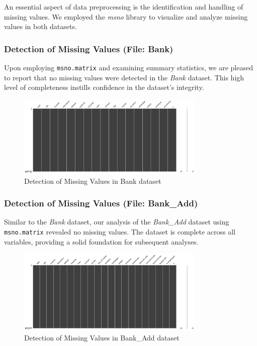 \documentclass{article}
\begin{document}
An essential aspect of data preprocessing is the identification and handling of missing values. We employed the \textit{msno} library to visualize and analyze missing values in both datasets.

\subsubsection{Detection of Missing Values (File: Bank)}
Upon employing \texttt{msno.matrix} and examining summary statistics, we are pleased to report that no missing values were detected in the \textit{Bank} dataset. This high level of completeness instills confidence in the dataset's integrity.
\begin{figure}[h]
    \centering
    \includegraphics[width=0.8\textwidth]{data/bank_marketing/pic/Outlier/miss_bank.png}
    \caption{Detection of Missing Values in Bank dataset}
    \label{fig:data_unveiled_bank}
\end{figure}

\subsubsection{Detection of Missing Values (File: Bank\_Add)}
Similar to the \textit{Bank} dataset, our analysis of the \textit{Bank\_Add} dataset using \texttt{msno.matrix} revealed no missing values. The dataset is complete across all variables, providing a solid foundation for subsequent analyses.
\begin{figure}[h]
    \centering
    \includegraphics[width=0.8\textwidth]{data/bank_marketing/pic/Outlier/miss_add.png}
    \caption{Detection of Missing Values in Bank\_Add dataset}
    \label{fig:data_unveiled_add}
\end{figure}
\end{document}
